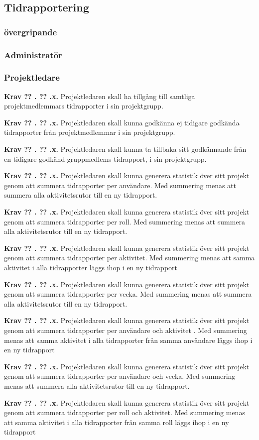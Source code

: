 \documentclass[a4paper]{article}
\newcommand\getcurrentref[1]{%
 \ifnumequal{\value{#1}}{0}
  {??}
  {\the\value{#1}}%
}
\newcommand\requirement[2]{
	\numberedrow{Krav}{#1}{#2}
}
\newcommand\numberedrow[3]{
	\noindent
	\textbf{#1 \getcurrentref{section}.\getcurrentref{subsection}.#2.} #3
	
}
\begin{document}
	\subsection{Tidrapportering}
		\label{krav-funk-tid}	
		\subsubsection*{övergripande}
		\subsubsection*{Administratör}
		\subsubsection*{Projektledare}
			\requirement{x}{Projektledaren skall ha tillgång till samtliga projektmedlemmars tidrapporter i sin projektgrupp.}
			\requirement{x}{Projektledaren skall kunna godkänna ej tidigare godkända tidrapporter från projektmedlemmar i sin projektgrupp.}
			\requirement{x}{Projektledaren skall kunna ta tillbaka sitt godkännande från en tidigare godkänd gruppmedlems tidrapport, i sin projektgrupp.}
			\requirement{x}{Projektledaren skall kunna generera statistik över sitt projekt genom att summera tidrapporter per användare. Med summering menas att summera alla aktivitetsrutor till en ny tidrapport.}
			\requirement{x}{Projektledaren skall kunna generera statistik över sitt projekt genom att summera tidrapporter per roll. Med summering menas att summera alla aktivitetsrutor till en ny tidrapport.}
			\requirement{x}{Projektledaren skall kunna generera statistik över sitt projekt genom att summera tidrapporter per aktivitet. Med summering menas att samma aktivitet i alla tidrapporter läggs ihop i en ny tidrapport}
			\requirement{x}{Projektledaren skall kunna generera statistik över sitt projekt genom att summera tidrapporter per vecka. Med summering menas att summera alla aktivitetsrutor till en ny tidrapport.}
			\requirement{x}{Projektledaren skall kunna generera statistik över sitt projekt genom att summera tidrapporter per användare och aktivitet . Med summering menas att samma aktivitet i alla tidrapporter från samma användare läggs ihop i en ny tidrapport}
			\requirement{x}{Projektledaren skall kunna generera statistik över sitt projekt genom att summera tidrapporter per användare och vecka. Med summering menas att summera alla aktivitetsrutor till en ny tidrapport.}
			\requirement{x}{Projektledaren skall kunna generera statistik över sitt projekt genom att summera tidrapporter per roll och aktivitet. Med summering menas att samma aktivitet i alla tidrapporter från samma roll läggs ihop i en ny tidrapport}
\end{document}
